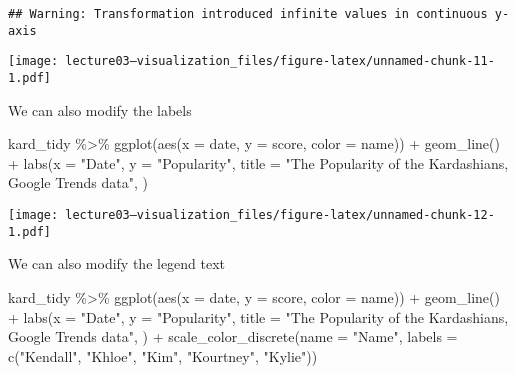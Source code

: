 \documentclass[
]{article}
\newenvironment{Shaded}{\begin{snugshade}}{\end{snugshade}}
\newcommand{\AttributeTok}[1]{\textcolor[rgb]{0.77,0.63,0.00}{#1}}
\newcommand{\FunctionTok}[1]{\textcolor[rgb]{0.00,0.00,0.00}{#1}}
\newcommand{\NormalTok}[1]{#1}
\newcommand{\SpecialCharTok}[1]{\textcolor[rgb]{0.00,0.00,0.00}{#1}}
\newcommand{\StringTok}[1]{\textcolor[rgb]{0.31,0.60,0.02}{#1}}
\begin{document}
\begin{verbatim}
## Warning: Transformation introduced infinite values in continuous y-axis
\end{verbatim}

\texttt{[image: lecture03---visualization\_files/figure-latex/unnamed-chunk-11-1.pdf]}

We can also modify the labels

\begin{Shaded}
\begin{Highlighting}[]
\NormalTok{kard\_tidy }\SpecialCharTok{\%\textgreater{}\%} 
  \FunctionTok{ggplot}\NormalTok{(}\FunctionTok{aes}\NormalTok{(}\AttributeTok{x =}\NormalTok{ date, }\AttributeTok{y =}\NormalTok{ score, }\AttributeTok{color =}\NormalTok{ name)) }\SpecialCharTok{+}
  \FunctionTok{geom\_line}\NormalTok{() }\SpecialCharTok{+}
  \FunctionTok{labs}\NormalTok{(}\AttributeTok{x =} \StringTok{"Date"}\NormalTok{,}
       \AttributeTok{y =} \StringTok{"Popularity"}\NormalTok{,}
       \AttributeTok{title =} \StringTok{"The Popularity of the Kardashians, Google Trends data"}\NormalTok{,}
\NormalTok{       )}
\end{Highlighting}
\end{Shaded}

\texttt{[image: lecture03---visualization\_files/figure-latex/unnamed-chunk-12-1.pdf]}

We can also modify the legend text

\begin{Shaded}
\begin{Highlighting}[]
\NormalTok{kard\_tidy }\SpecialCharTok{\%\textgreater{}\%} 
  \FunctionTok{ggplot}\NormalTok{(}\FunctionTok{aes}\NormalTok{(}\AttributeTok{x =}\NormalTok{ date, }\AttributeTok{y =}\NormalTok{ score, }\AttributeTok{color =}\NormalTok{ name)) }\SpecialCharTok{+}
  \FunctionTok{geom\_line}\NormalTok{() }\SpecialCharTok{+}
  \FunctionTok{labs}\NormalTok{(}\AttributeTok{x =} \StringTok{"Date"}\NormalTok{,}
       \AttributeTok{y =} \StringTok{"Popularity"}\NormalTok{,}
       \AttributeTok{title =} \StringTok{"The Popularity of the Kardashians, Google Trends data"}\NormalTok{,}
\NormalTok{       ) }\SpecialCharTok{+}
  \FunctionTok{scale\_color\_discrete}\NormalTok{(}\AttributeTok{name =} \StringTok{"Name"}\NormalTok{,}
                       \AttributeTok{labels =} \FunctionTok{c}\NormalTok{(}\StringTok{"Kendall"}\NormalTok{, }\StringTok{"Khloe"}\NormalTok{, }\StringTok{"Kim"}\NormalTok{, }\StringTok{"Kourtney"}\NormalTok{, }\StringTok{"Kylie"}\NormalTok{))}
\end{Highlighting}
\end{Shaded}
\end{document}
